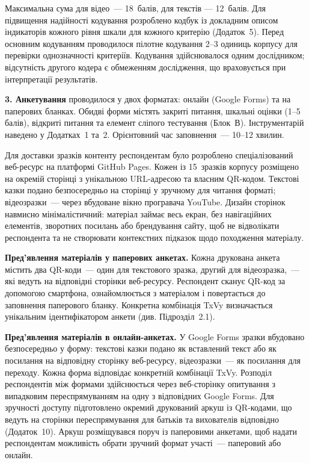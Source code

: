\documentclass[14pt, a4paper]{extreport}
\begin{document}
Максимальна сума для відео~--- 18~балів, для текстів --- 12~балів.
\newpage
Для підвищення надійності кодування розроблено кодбук із докладним описом індикаторів кожного рівня шкали для кожного критерію (Додаток~5). Перед основним кодуванням проводилося пілотне кодування 2--3 одиниць корпусу для перевірки однозначності критеріїв. Кодування здійснювалося одним дослідником; відсутність другого кодера є обмеженням дослідження, що враховується при інтерпретації результатів.

\textbf{3. Анкетування} проводилося у двох форматах: онлайн (Google Forms) та на паперових бланках. Обидві форми містять закриті питання, шкальні оцінки (1--5 балів), відкриті питання та елемент сліпого тестування (Блок~В). Інструментарій наведено у Додатках~1 та~2. Орієнтовний час заповнення~--- 10--12 хвилин.

Для доставки зразків контенту респондентам було розроблено спеціалізований веб-ресурс на платформі GitHub Pages. Кожен із 15~зразків корпусу розміщено на окремій сторінці з унікальною URL-адресою та власним QR-кодом. Текстові казки подано безпосередньо на сторінці у зручному для читання форматі; відеозразки~--- через вбудоване вікно програвача YouTube. Дизайн сторінок навмисно мінімалістичний: матеріал займає весь екран, без навігаційних елементів, зворотних посилань або брендування сайту, щоб не відволікати респондента та не створювати контекстних підказок щодо походження матеріалу.

\textbf{Пред'явлення матеріалів у паперових анкетах.} Кожна друкована анкета містить два QR-коди~--- один для текстового зразка, другий для відеозразка,~--- які ведуть на відповідні сторінки веб-ресурсу. Респондент сканує QR-код за допомогою смартфона, ознайомлюється з матеріалом і повертається до заповнення паперового бланку. Конкретна комбінація TxVy визначається унікальним ідентифікатором анкети (див. Підрозділ~2.1).

\textbf{Пред'явлення матеріалів в онлайн-анкетах.} У Google Forms зразки вбудовано безпосередньо у форму: текстові казки подано як вставлений текст або як посилання на відповідну сторінку веб-ресурсу, відеозразки~--- як посилання для переходу. Кожна форма відповідає конкретній комбінації TxVy. Розподіл респондентів між формами здійснюється через веб-сторінку опитування з випадковим переспрямуванням на одну з відповідних Google Forms. Для зручності доступу підготовлено окремий друкований аркуш із QR-кодами, що ведуть на сторінки переспрямування для батьків та вихователів відповідно (Додаток~10). Аркуш розміщувався поруч із паперовими анкетами, щоб надати респондентам можливість обрати зручний формат участі~--- паперовий або онлайн.
\end{document}

